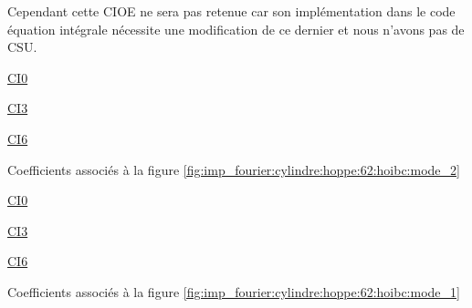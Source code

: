   Cependant cette CIOE ne sera pas retenue car son implémentation dans le code équation intégrale nécessite une modification de ce dernier et nous n'avons pas de CSU.
  \begin{table}[!hbt]
    \centering
    \begin{minipage}[t]{0.49\textwidth}
      \vspace{0pt}
      \centering
      \begin{coefftable}{\hyperlink{ci0}{CI0}}
        
      \end{coefftable}
      \begin{coefftable}{\hyperlink{ci3}{CI3}}
        
      \end{coefftable}
    \end{minipage}
    \begin{minipage}[t]{0.49\textwidth}
      \vspace{0pt}
      \centering
      \begin{coefftable}{\hyperlink{ci6}{CI6}}
        
      \end{coefftable}
    \end{minipage}
    \caption{Coefficients associés à la figure \ref{fig:imp_fourier:cylindre:hoppe:62:hoibc:mode_2}}
    \label{tab:imp_fourier:cylindre:hoppe:62:hoibc:mode_2}
  \end{table}
  \begin{table}[!hbt]
    \centering
    \begin{minipage}[t]{0.49\textwidth}
      \vspace{0pt}
      \centering
      \begin{coefftable}{\hyperlink{ci0}{CI0}}
        
      \end{coefftable}
      \begin{coefftable}{\hyperlink{ci3}{CI3}}
        
      \end{coefftable}
    \end{minipage}
    \begin{minipage}[t]{0.49\textwidth}
      \vspace{0pt}
      \centering
      \begin{coefftable}{\hyperlink{ci6}{CI6}}
        
      \end{coefftable}
    \end{minipage}
    \caption{Coefficients associés à la figure \ref{fig:imp_fourier:cylindre:hoppe:62:hoibc:mode_1}}
    \label{tab:imp_fourier:cylindre:hoppe:62:hoibc:mode_1}
  \end{table}


